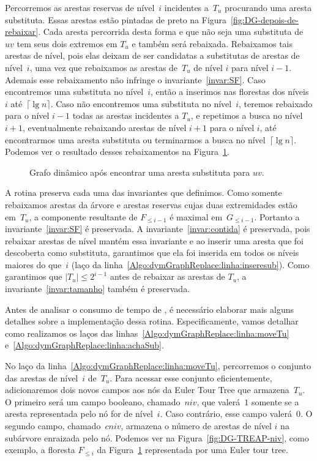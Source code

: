 Percorremos as arestas reservas de nível~$i$ incidentes a~$T_u$ procurando uma aresta substituta. Essas arestas estão pintadas de preto na Figura~\ref{fig:DG-depois-de-rebaixar}. Cada aresta percorrida desta forma e que não seja uma substituta de~$uv$ tem seus dois extremos em $T_u$ e também será rebaixada.
Rebaixamos tais arestas de nível, pois elas deixam de ser candidatas a substitutas de arestas de nível~$i$, uma vez que rebaixamos as arestas de~$T_u$ de nível $i$ para nível $i-1$. 
Ademais esse rebaixamento não infringe o invariante~\ref{invar:SF}.
Caso encontremos uma substituta no nível~$i$, então a inserimos nas florestas dos níveis~$i$ até~$\lceil \lg n \rceil$. Caso não encontremos uma substituta no nível~$i$, teremos rebaixado para o nível $i-1$ todas as arestas incidentes a $T_u$, e repetimos a busca no nível~$i+1$, eventualmente rebaixando arestas de nível $i+1$ para o nível $i$, até encontrarmos uma aresta substituta ou terminarmos a busca no nível~$\lceil \lg n \rceil$. Podemos ver o resultado desses rebaixamentos na Figura~\ref{fig:DG-depois-achou-sub}.
\begin{figure}[htb]
\centering
\caption{Grafo dinâmico após encontrar uma aresta substituta para $uv$.}
\label{fig:DG-depois-achou-sub}
\end{figure}

A rotina \dymGraphReplace{} preserva cada uma das invariantes que definimos. 
Como somente rebaixamos arestas da árvore e arestas reservas cujas duas extremidades estão em~$T_u$, a componente resultante de $F_{\leqslant i-1}$ é maximal em~$G_{\leqslant i-1}$. Portanto a invariante~\ref{invar:SF} é preservada.
A invariante~\ref{invar:contida} é preservada, pois rebaixar arestas de nível mantém essa invariante e ao inserir uma aresta que foi descoberta como substituta, garantimos que ela foi inserida em todos os níveis maiores do que~$i$ (laço da linha~\ref{Algo:dymGraphReplace:linha:inseresub}).  
Como garantimos que $|T_u| \leqslant 2^{i-1}$ antes de rebaixar as arestas de $T_u$, a invariante~\ref{invar:tamanho} também é preservada.

Antes de analisar o consumo de tempo de \dymGraphReplace{}, é necessário elaborar mais alguns detalhes sobre a implementação dessa rotina. Especificamente, vamos detalhar como realizamos os laços das linhas~\ref{Algo:dymGraphReplace:linha:moveTu} e~\ref{Algo:dymGraphReplace:linha:achaSub}.

No laço da linha~\ref{Algo:dymGraphReplace:linha:moveTu}, percorremos o conjunto das arestas de nível~$i$ de~$T_u$. Para acessar esse conjunto eficientemente, adicionaremos dois novos campos aos nós da Euler Tour Tree que armazena~$T_u$. O primeiro será um campo booleano, chamado~$niv$, que valerá~$1$ somente se a aresta representada pelo nó for de nível~$i$. Caso contrário, esse campo valerá~$0$. O segundo campo, chamado~$cniv$, armazena o número de arestas de nível $i$ na subárvore enraizada pelo nó. Podemos ver na Figura~\ref{fig:DG-TREAP-niv}, como exemplo, a floresta $F_{\leqslant i}$ da Figura~\ref{fig:DG-depois-achou-sub} representada por uma Euler tour tree.

